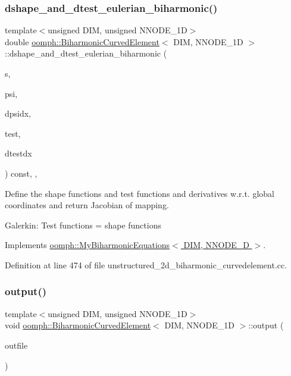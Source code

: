 \subsubsection{\texorpdfstring{dshape\+\_\+and\+\_\+dtest\+\_\+eulerian\+\_\+biharmonic()}{dshape\_and\_dtest\_eulerian\_biharmonic()}}
{\footnotesize\ttfamily template$<$unsigned D\+IM, unsigned N\+N\+O\+D\+E\+\_\+1D$>$ \\
double \hyperlink{classoomph_1_1BiharmonicCurvedElement}{oomph\+::\+Biharmonic\+Curved\+Element}$<$ D\+IM, N\+N\+O\+D\+E\+\_\+1D $>$\+::dshape\+\_\+and\+\_\+dtest\+\_\+eulerian\+\_\+biharmonic (\begin{DoxyParamCaption}\item[{const Vector$<$ double $>$ \&}]{s,  }\item[{Shape \&}]{psi,  }\item[{D\+Shape \&}]{dpsidx,  }\item[{Shape \&}]{test,  }\item[{D\+Shape \&}]{dtestdx }\end{DoxyParamCaption}) const\hspace{0.3cm}{\ttfamily [inline]}, {\ttfamily [protected]}, {\ttfamily [virtual]}}

Define the shape functions and test functions and derivatives w.\+r.\+t. global coordinates and return Jacobian of mapping.

Galerkin\+: Test functions = shape functions 

Implements \hyperlink{classoomph_1_1MyBiharmonicEquations_a084eaadd62185dad622c7708862f023a}{oomph\+::\+My\+Biharmonic\+Equations$<$ D\+I\+M, N\+N\+O\+D\+E\+\_\+D $>$}.



Definition at line 474 of file unstructured\+\_\+2d\+\_\+biharmonic\+\_\+curvedelement.\+cc.

\mbox{\label{classoomph_1_1BiharmonicCurvedElement_a702f7fef5954cb750e30579ce4a8a0da}} 
\subsubsection{\texorpdfstring{output()}{output()}\hspace{0.1cm}{\footnotesize\ttfamily [1/4]}}
{\footnotesize\ttfamily template$<$unsigned D\+IM, unsigned N\+N\+O\+D\+E\+\_\+1D$>$ \\
void \hyperlink{classoomph_1_1BiharmonicCurvedElement}{oomph\+::\+Biharmonic\+Curved\+Element}$<$ D\+IM, N\+N\+O\+D\+E\+\_\+1D $>$\+::output (\begin{DoxyParamCaption}\item[{std\+::ostream \&}]{outfile }\end{DoxyParamCaption})\hspace{0.3cm}{\ttfamily [inline]}}



